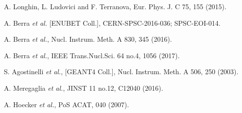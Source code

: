 \documentclass[12pt]{article}
\begin{document}
\begin{thebibliography}{99}


A. Longhin, L. Ludovici and F. Terranova, Eur. Phys. J. C 75, 155 (2015).

A. Berra \textit{et al.} [ENUBET Coll.], CERN-SPSC-2016-036; SPSC-EOI-014.

A. Berra \textit{et al.}, Nucl. Instrum. Meth. A 830, 345 (2016).

A. Berra \textit{et al.}, IEEE Trans.Nucl.Sci. 64 no.4, 1056 (2017).

S. Agostinelli \textit{et al.}, [GEANT4 Coll.], Nucl. Instrum. Meth. A 506, 250 (2003).

A. Meregaglia \textit{et al.}, JINST 11 no.12, C12040 (2016).

A. Hoecker \textit{et al.}, PoS ACAT, 040 (2007).


\end{thebibliography}

 
\end{document}
